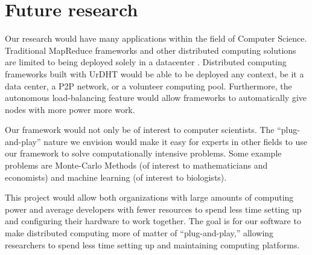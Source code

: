 \documentclass[letterpaper]{article}
\begin{document}
%
%
%
%
%


\section{Future research}

Our research would have many applications within the field of Computer Science.
Traditional MapReduce frameworks and other distributed computing solutions are limited to being deployed solely in a datacenter \cite{hadoopAssumptions}.
Distributed computing frameworks built with UrDHT would be able to be deployed any context, be it a data center, a P2P network, or a volunteer computing pool.
Furthermore, the autonomous load-balancing feature would allow frameworks to automatically give nodes with more power more work.

Our framework would not only be of interest to computer scientists.
The ``plug-and-play'' nature we envision would make it easy for experts in other fields to use our framework to solve computationally intensive problems.
Some example problems are Monte-Carlo Methods (of interest to mathematicians and economists) and machine learning (of interest to biologists).

This project would allow both organizations with large amounts of computing power and average developers with  fewer resources to spend less time setting up and configuring their hardware to work together.  
The goal is for our software to make distributed computing more of matter of ``plug-and-play,'' allowing researchers to spend less time setting up and maintaining  computing platforms.






\end{document}
